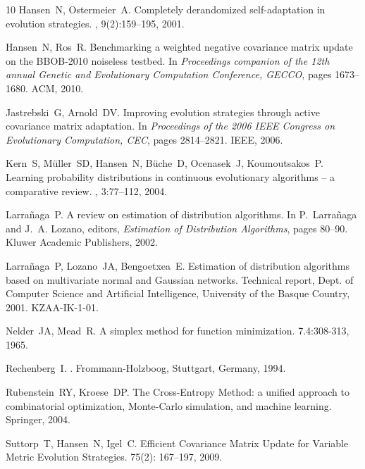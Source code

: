 \documentclass{article} %
\begin{document}
\begin{thebibliography}{10}
Hansen~N, Ostermeier~A.
\newblock Completely derandomized self-adaptation in evolution strategies.
, 9(2):159--195, 2001.

Hansen~N, Ros~R. 
\newblock Benchmarking a weighted negative covariance matrix update on the BBOB-2010 noiseless testbed. 
\newblock In {\em Proceedings companion of the 12th annual Genetic and Evolutionary Computation Conference, GECCO}, pages 1673--1680. ACM, 2010.

Jastrebski~G, Arnold~DV. 
\newblock
Improving evolution strategies through active covariance matrix adaptation. 
\newblock In {\em Proceedings of the 2006 IEEE Congress on Evolutionary Computation, CEC}, pages 2814--2821. IEEE, 2006. 

Kern~S, M\"{u}ller~SD, Hansen~N, B\"{u}che~D,
  Ocenasek~J,  Koumoutsakos~P.
\newblock Learning probability distributions in continuous evolutionary
  algorithms -- a comparative review.
, 3:77--112, 2004.

Larra\~naga~P.
\newblock A review on estimation of distribution algorithms.
\newblock In P.~Larra\~naga and J.~A. Lozano, editors, {\em Estimation of
  Distribution Algorithms}, pages 80--90. Kluwer Academic Publishers, 2002.

Larra\~naga~P, Lozano~JA, Bengoetxea~E.
\newblock Estimation of distribution algorithms based on multivariate normal
  and {G}aussian networks.
\newblock Technical report, Dept. of Computer Science and Artificial
  Intelligence, University of the Basque Country, 2001.
\newblock KZAA-IK-1-01.

Nelder~JA, Mead~R. 
\newblock
A simplex method for function minimization. 
 7.4:308-313, 1965.

Rechenberg~I.
.
\newblock Frommann-Holzboog, Stuttgart, Germany, 1994.

  Rubenstein~RY, Kroese~DP. 
\newblock  The Cross-Entropy Method: a unified approach to combinatorial optimization, Monte-Carlo simulation, and machine learning.
\newblock Springer, 2004.

 Suttorp~T, Hansen~N, Igel~C.
\newblock Efficient Covariance Matrix Update for Variable Metric Evolution Strategies.
 75(2): 167--197, 2009.


\end{thebibliography}
\end{document}
